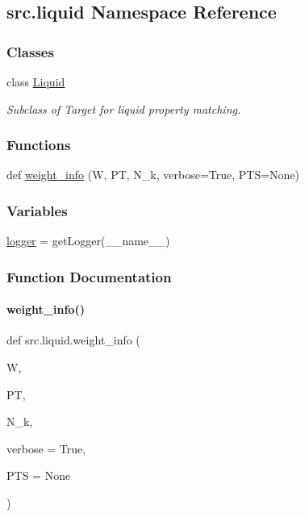 \hypertarget{namespacesrc_1_1liquid}{}\subsection{src.\+liquid Namespace Reference}
\label{namespacesrc_1_1liquid}
\subsubsection*{Classes}
\begin{DoxyCompactItemize}
\item 
class \hyperlink{classsrc_1_1liquid_1_1Liquid}{Liquid}
\begin{DoxyCompactList}\small\item\em Subclass of Target for liquid property matching. \end{DoxyCompactList}\end{DoxyCompactItemize}
\subsubsection*{Functions}
\begin{DoxyCompactItemize}
\item 
def \hyperlink{namespacesrc_1_1liquid_a5ad9c3640a1f3ba97408b8ece94eb7c0}{weight\+\_\+info} (W, PT, N\+\_\+k, verbose=True, P\+TS=None)
\end{DoxyCompactItemize}
\subsubsection*{Variables}
\begin{DoxyCompactItemize}
\item 
\hyperlink{namespacesrc_1_1liquid_a94b65ba658e49a2161816eab3db1b1b6}{logger} = get\+Logger(\+\_\+\+\_\+name\+\_\+\+\_\+)
\end{DoxyCompactItemize}


\subsubsection{Function Documentation}
\mbox{\label{namespacesrc_1_1liquid_a5ad9c3640a1f3ba97408b8ece94eb7c0}} 
\paragraph{\texorpdfstring{weight\+\_\+info()}{weight\_info()}}
{\footnotesize\ttfamily def src.\+liquid.\+weight\+\_\+info (\begin{DoxyParamCaption}\item[{}]{W,  }\item[{}]{PT,  }\item[{}]{N\+\_\+k,  }\item[{}]{verbose = {\ttfamily True},  }\item[{}]{P\+TS = {\ttfamily None} }\end{DoxyParamCaption})}



